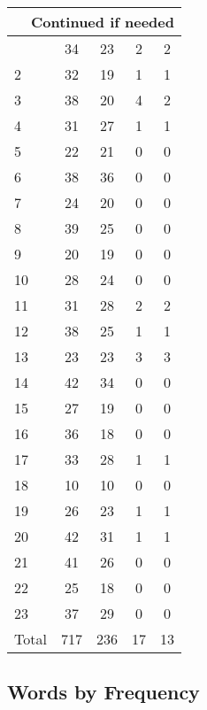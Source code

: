\begin{center}
\begin{longtable}{l|c|c|c|c}
\hline \multicolumn{5}{|r|}{{Continued if needed}} \\ \hline
\endfoot 
1 & 34 & 23 & 2 & 2\\ \hline
2 & 32 & 19 & 1 & 1\\ \hline
3 & 38 & 20 & 4 & 2\\ \hline
4 & 31 & 27 & 1 & 1\\ \hline
5 & 22 & 21 & 0 & 0\\ \hline
6 & 38 & 36 & 0 & 0\\ \hline
7 & 24 & 20 & 0 & 0\\ \hline
8 & 39 & 25 & 0 & 0\\ \hline
9 & 20 & 19 & 0 & 0\\ \hline
10 & 28 & 24 & 0 & 0\\ \hline
11 & 31 & 28 & 2 & 2\\ \hline
12 & 38 & 25 & 1 & 1\\ \hline
13 & 23 & 23 & 3 & 3\\ \hline
14 & 42 & 34 & 0 & 0\\ \hline
15 & 27 & 19 & 0 & 0\\ \hline
16 & 36 & 18 & 0 & 0\\ \hline
17 & 33 & 28 & 1 & 1\\ \hline
18 & 10 & 10 & 0 & 0\\ \hline
19 & 26 & 23 & 1 & 1\\ \hline
20 & 42 & 31 & 1 & 1\\ \hline
21 & 41 & 26 & 0 & 0\\ \hline
22 & 25 & 18 & 0 & 0\\ \hline
23 & 37 & 29 & 0 & 0\\ \hline
\hline \hline
Total & 717 & 236 & 17 & 13



\end{longtable}
\end{center}

 
\subsection{Words by Frequency}

